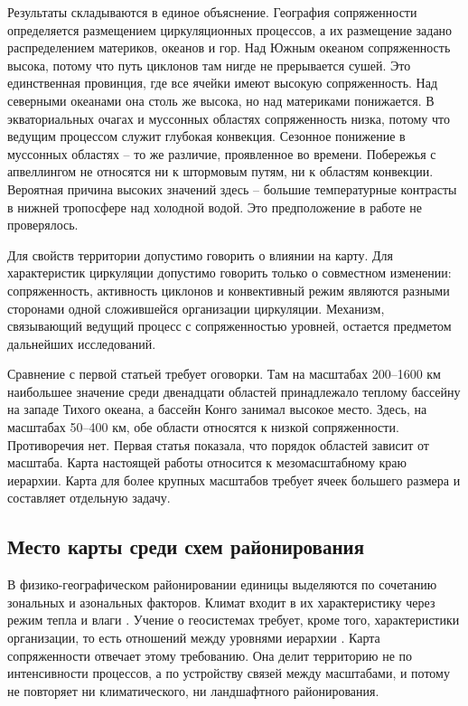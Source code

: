 \documentclass[12pt,a4paper]{article}
\begin{document}
Результаты складываются в единое объяснение. География сопряженности определяется размещением циркуляционных процессов, а их размещение задано распределением материков, океанов и гор. Над Южным океаном сопряженность высока, потому что путь циклонов там нигде не прерывается сушей. Это единственная провинция, где все ячейки имеют высокую сопряженность. Над северными океанами она столь же высока, но над материками понижается. В экваториальных очагах и муссонных областях сопряженность низка, потому что ведущим процессом служит глубокая конвекция. Сезонное понижение в муссонных областях -- то же различие, проявленное во времени. Побережья с апвеллингом не относятся ни к штормовым путям, ни к областям конвекции. Вероятная причина высоких значений здесь -- большие температурные контрасты в нижней тропосфере над холодной водой. Это предположение в работе не проверялось.

Для свойств территории допустимо говорить о влиянии на карту. Для характеристик циркуляции допустимо говорить только о совместном изменении: сопряженность, активность циклонов и конвективный режим являются разными сторонами одной сложившейся организации циркуляции. Механизм, связывающий ведущий процесс с сопряженностью уровней, остается предметом дальнейших исследований.

Сравнение с первой статьей требует оговорки. Там на масштабах 200--1600 км наибольшее значение среди двенадцати областей принадлежало теплому бассейну на западе Тихого океана, а бассейн Конго занимал высокое место. Здесь, на масштабах 50--400 км, обе области относятся к низкой сопряженности. Противоречия нет. Первая статья показала, что порядок областей зависит от масштаба. Карта настоящей работы относится к мезомасштабному краю иерархии. Карта для более крупных масштабов требует ячеек большего размера и составляет отдельную задачу.

\subsection{Место карты среди схем районирования}

В физико-географическом районировании единицы выделяются по сочетанию зональных и азональных факторов. Климат входит в их характеристику через режим тепла и влаги \cite{Isachenko1991}. Учение о геосистемах требует, кроме того, характеристики организации, то есть отношений между уровнями иерархии \cite{Sochava1978,Puzachenko2010}. Карта сопряженности отвечает этому требованию. Она делит территорию не по интенсивности процессов, а по устройству связей между масштабами, и потому не повторяет ни климатического, ни ландшафтного районирования.
\end{document}
